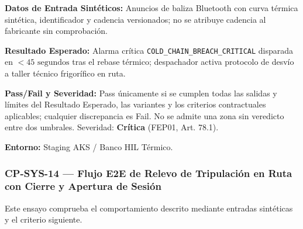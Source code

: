 \par\noindent\textbf{Datos de Entrada Sintéticos:} Anuncios de baliza Bluetooth con curva térmica sintética, identificador y cadencia versionados; no se atribuye cadencia al fabricante sin comprobación.\par
\par\noindent\textbf{Resultado Esperado:} Alarma crítica \texttt{COLD\_\allowbreak{}CHAIN\_\allowbreak{}BREACH\_\allowbreak{}CRITICAL} disparada en \(< 45\text{ segundos}\) tras el rebase térmico; despachador activa protocolo de desvío a taller técnico frigorífico en ruta.\par
\par\noindent\textbf{Pass/Fail y Severidad:} Pass únicamente si se cumplen todas las salidas y límites del Resultado Esperado, las variantes y los criterios contractuales aplicables; cualquier discrepancia es Fail. No se admite una zona sin veredicto entre dos umbrales. Severidad: \textbf{Crítica} (FEP01, Art. 78.1).\par
\par\noindent\textbf{Entorno:} Staging AKS / Banco HIL Térmico.\par


\subsubsection*{CP-SYS-14 — Flujo E2E de Relevo de Tripulación en Ruta con Cierre y Apertura de Sesión}\label{sec:9-cp-sys-14}
Este ensayo comprueba el comportamiento descrito mediante entradas sintéticas y el criterio siguiente.

